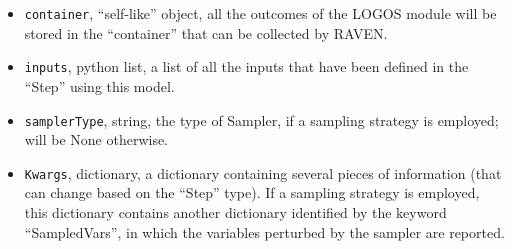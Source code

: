 \begin{itemize}
  \item \texttt{container}, ``self-like'' object, all the outcomes of the LOGOS
    module will be stored in the ``container'' that can be collected by RAVEN.
  \item \texttt{inputs}, python list, a list of all the inputs that have been
    defined in the ``Step'' using this model.
  \item \texttt{samplerType}, string, the type of Sampler, if a sampling strategy
    is employed; will be None otherwise.
  \item \texttt{Kwargs}, dictionary, a dictionary containing several pieces of
    information (that can change based on the ``Step'' type). If a sampling strategy
    is employed, this dictionary contains another dictionary identified by the
    keyword ``SampledVars'', in which the variables perturbed by the sampler are reported.
\end{itemize}
